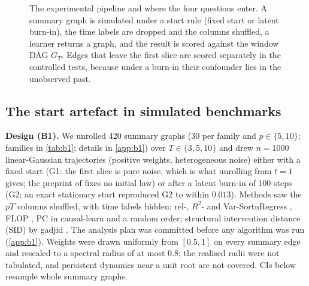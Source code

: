 \documentclass[pdflatex,sn-apa]{sn-jnl}
\newcommand{\tikzfig}[1]{\adjustbox{max width=\textwidth,center}{}}
\theoremstyle{thmstyleone}
\theoremstyle{thmstylethree}
\theoremstyle{thmstyletwo}
\begin{document}
\begin{figure}[t]
\centering
\tikzfig{fig_pipeline}
\caption{The experimental pipeline and where the four questions enter. A summary graph is simulated under a start rule (fixed start or
latent burn-in), the time labels are dropped and the columns shuffled, a learner returns a graph, and the result is scored against the
window DAG $G_T$. Edges that leave the first slice are scored separately in the controlled tests, because under a burn-in their
confounder lies in the unobserved past.}
\label{fig:pipeline}
\end{figure}

\subsection{The start artefact in simulated benchmarks}
\label{sec:b1}
\label{sec:b1exp}

\textbf{Design (B1).} We unrolled 420 summary graphs (30 per family and
$p\in\{5,10\}$; families in \cref{tab:b1}; details in \cref{app:b1}) over $T\in\{3,5,10\}$ and drew
$n=1000$ linear-Gaussian trajectories (positive weights, heterogeneous noise)
either with a fixed start (G1: the first slice is pure noise, which is what
unrolling from $t=1$ gives; the preprint of \citealt{reisach2026topological}
fixes no initial law) or after a latent burn-in of 100 steps (G2; an exact stationary start reproduced G2 to
within $0.013$). Methods saw the $pT$ columns shuffled, with time labels
hidden: rel-, $R^2$- and Var-SortnRegress
\citep{reisach2026topological,reisach2023scale}, FLOP
\citep{wienobst2026flop}, PC \citep{spirtes2000causation} in causal-learn
\citep{zheng2024causallearn} and a random order; structural intervention distance (SID) by gadjid
\citep{henckel2024gadjid}. The analysis plan was committed before any
algorithm was run (\cref{app:b1}). Weights were drawn uniformly from
$[0.5,1]$ on every summary edge and rescaled to a spectral radius of at most
$0.8$; the realised radii were not tabulated, and persistent dynamics near a
unit root are not covered. CIs below resample whole summary graphs.
\end{document}
